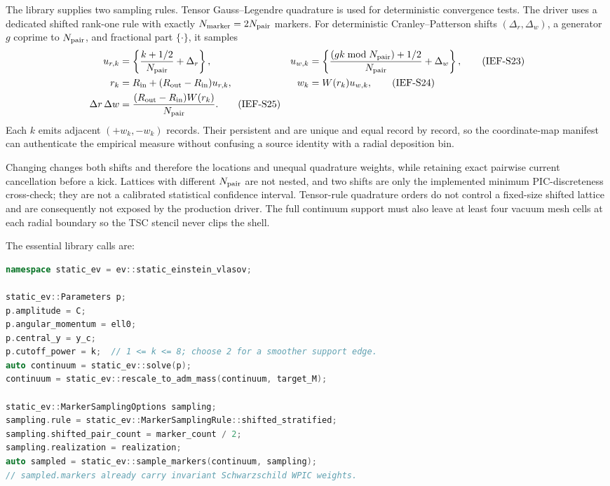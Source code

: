 The library supplies two sampling rules.  Tensor Gauss--Legendre quadrature
is used for deterministic convergence tests.  The driver uses a dedicated
shifted rank-one rule with exactly
\(N_{\rm marker}=2N_{\rm pair}\) markers.  For deterministic
Cranley--Patterson shifts \((\Delta_r,\Delta_w)\), a generator \(g\) coprime
to \(N_{\rm pair}\), and fractional part \(\{\cdot\}\), it samples
\begin{align}
 u_{r,k}&=\left\{\frac{k+1/2}{N_{\rm pair}}+\Delta_r\right\},&
 u_{w,k}&=\left\{\frac{(gk\bmod N_{\rm pair})+1/2}
                         {N_{\rm pair}}+\Delta_w\right\},       \tag{IEF-S23}\\
 r_k&=R_{\rm in}+(R_{\rm out}-R_{\rm in})u_{r,k},&
 w_k&=W(r_k)u_{w,k},                                    \tag{IEF-S24}\\
 \Delta r\,\Delta w&=
 \frac{(R_{\rm out}-R_{\rm in})W(r_k)}{N_{\rm pair}}.
                                                               \tag{IEF-S25}
\end{align}
Each \(k\) emits adjacent \((+w_k,-w_k)\) records.  Their persistent
 and  are unique and equal record by record, so
the coordinate-map manifest can authenticate the empirical measure without
confusing a source identity with a radial deposition bin.

Changing  changes both shifts and therefore
the locations and unequal quadrature weights, while retaining exact pairwise
current cancellation before a kick.  Lattices with different
\(N_{\rm pair}\) are not nested, and two shifts are only the implemented
minimum PIC-discreteness cross-check; they are not a calibrated statistical
confidence interval.  Tensor-rule quadrature orders do not control a
fixed-size shifted lattice and are consequently not exposed by the
production driver.  The full continuum support must also leave at least four
vacuum mesh cells at each radial boundary so the TSC stencil never clips the
shell.

The essential library calls are:
\begin{lstlisting}[language=C++,basicstyle=\ttfamily\scriptsize]
namespace static_ev = ev::static_einstein_vlasov;

static_ev::Parameters p;
p.amplitude = C;
p.angular_momentum = ell0;
p.central_y = y_c;
p.cutoff_power = k;  // 1 <= k <= 8; choose 2 for a smoother support edge.
auto continuum = static_ev::solve(p);
continuum = static_ev::rescale_to_adm_mass(continuum, target_M);

static_ev::MarkerSamplingOptions sampling;
sampling.rule = static_ev::MarkerSamplingRule::shifted_stratified;
sampling.shifted_pair_count = marker_count / 2;
sampling.realization = realization;
auto sampled = static_ev::sample_markers(continuum, sampling);
// sampled.markers already carry invariant Schwarzschild WPIC weights.
\end{lstlisting}

